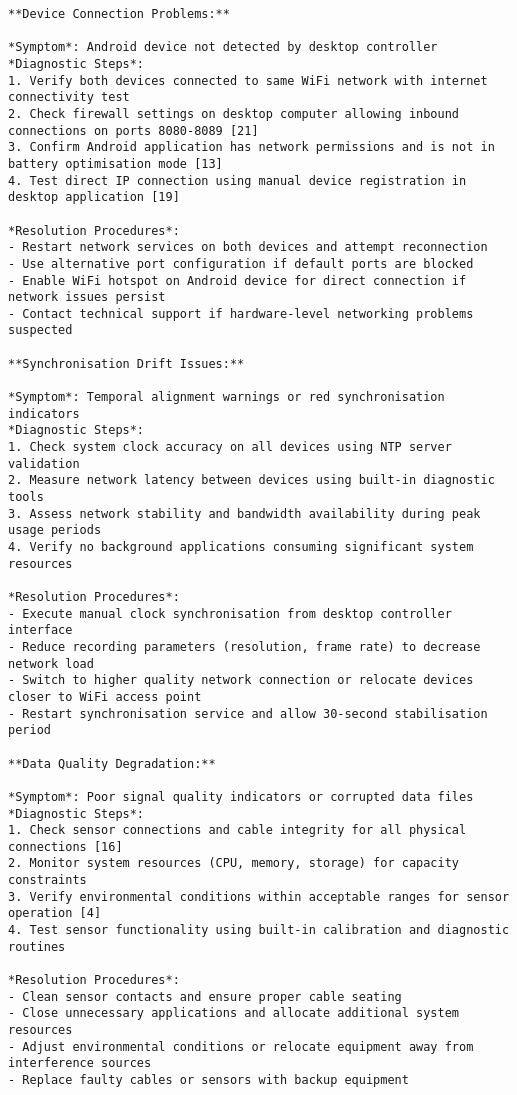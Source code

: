 \begin{verbatim}
**Device Connection Problems:**

*Symptom*: Android device not detected by desktop controller
*Diagnostic Steps*:
1. Verify both devices connected to same WiFi network with internet connectivity test
2. Check firewall settings on desktop computer allowing inbound connections on ports 8080-8089 [21]
3. Confirm Android application has network permissions and is not in battery optimisation mode [13]
4. Test direct IP connection using manual device registration in desktop application [19]

*Resolution Procedures*:
- Restart network services on both devices and attempt reconnection
- Use alternative port configuration if default ports are blocked
- Enable WiFi hotspot on Android device for direct connection if network issues persist
- Contact technical support if hardware-level networking problems suspected

**Synchronisation Drift Issues:**

*Symptom*: Temporal alignment warnings or red synchronisation indicators
*Diagnostic Steps*:
1. Check system clock accuracy on all devices using NTP server validation
2. Measure network latency between devices using built-in diagnostic tools
3. Assess network stability and bandwidth availability during peak usage periods
4. Verify no background applications consuming significant system resources

*Resolution Procedures*:
- Execute manual clock synchronisation from desktop controller interface
- Reduce recording parameters (resolution, frame rate) to decrease network load
- Switch to higher quality network connection or relocate devices closer to WiFi access point
- Restart synchronisation service and allow 30-second stabilisation period

**Data Quality Degradation:**

*Symptom*: Poor signal quality indicators or corrupted data files
*Diagnostic Steps*:
1. Check sensor connections and cable integrity for all physical connections [16]
2. Monitor system resources (CPU, memory, storage) for capacity constraints
3. Verify environmental conditions within acceptable ranges for sensor operation [4]
4. Test sensor functionality using built-in calibration and diagnostic routines

*Resolution Procedures*:
- Clean sensor contacts and ensure proper cable seating
- Close unnecessary applications and allocate additional system resources
- Adjust environmental conditions or relocate equipment away from interference sources
- Replace faulty cables or sensors with backup equipment


\end{verbatim}
